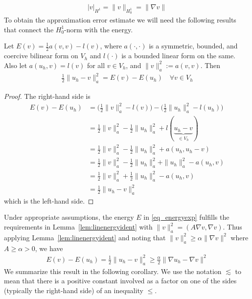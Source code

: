 \documentclass[12pt]{article}
\begin{document}
\begin{align}
	|v|_{H^1} = \|v\|_{H_0^1} = \| \nabla v \|
	\label{eq_H01normdef}
\end{align}
To obtain the approximation error estimate we will need the following results that connect the $H_0^1$-norm with the energy.
\begin{lem}\label{lem:linenergyident}
Let $E(v) = \frac{1}{2}a(v, v) - l(v)$, where $a(\cdot, \cdot)$ is a symmetric, bounded, and coercive bilinear form on $V_h$ and $l(\cdot)$ is a bounded linear form on the same. Also let $a(u_h, v) = l(v)$ for all $v \in V_h$, and $\| v \|_a^2 := a(v, v)$. Then
	\begin{align}
		\frac{1}{2} \| u_{h} - v \|_{a}^2 = E(v) - E(u_{h}) \quad \forall v \in V_h
	\end{align}
	\begin{proof}
		The right-hand side is
		\begin{equation}
		\begin{aligned}
			E(v) - E(u_{h}) &= \bigg(\frac{1}{2} \| v \|_a^2 - l(v) \bigg) - \bigg(\frac{1}{2} \| u_{h} \|_a^2 - l(u_h)\bigg) \\
			&= \frac{1}{2} \| v \|_a^2 - \frac{1}{2} \| u_{h} \|_a^2 + l(\underbrace{u_{h} - v}_{\in V_h}) \\
			&= \frac{1}{2} \| v \|_a^2 - \frac{1}{2} \| u_{h} \|_a^2 + a(u_{h}, u_{h} - v) \\
			&= \frac{1}{2} \| v \|_a^2 - \frac{1}{2} \| u_{h} \|_a^2 + \| u_{h} \|_a^2 - a(u_{h}, v)\\
			&= \frac{1}{2} \| v \|_a^2 + \frac{1}{2} \| u_{h} \|_a^2 - a(u_{h}, v)\\
			&= \frac{1}{2} \| u_{h} - v \|_a^2
		\end{aligned}
		\end{equation}
		which is the left-hand side.
	\end{proof}
\end{lem}

Under appropriate assumptions, the energy $E$ in \eqref{eq_energyexp} fulfills the requirements in Lemma~\ref{lem:linenergyident} with $\| v \|_a^2 = (A \nabla v, \nabla v)$. Thus applying Lemma~\ref{lem:linenergyident} and noting that $\| v \|_a^2 \geq \alpha \| \nabla v \|^2$ where $A \geq \alpha > 0$, we have
\begin{align}
E(v) - E(u_h) = \frac{1}{2} \| u_h - v \|_a^2 \geq \frac{\alpha}{2} \| \nabla u_h - \nabla v \|^2
\end{align}
We summarize this result in the following corollary. We use the notation $\lesssim$ to mean that there is a positive constant involved as a factor on one of the sides (typically the right-hand side) of an inequality $\leq$.
\end{document}
